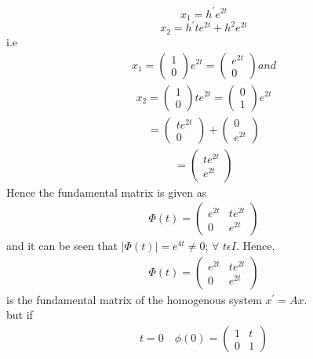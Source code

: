\documentclass[a4paper, 12pt]{article}
\begin{document}
$$ x_1 = h^\prime e^{2t} $$
$$ x_2 = h^\prime te^{2t} + h^2 e^{2t} $$
i.e 
\begin{align*}
x_1 =
\begin{pmatrix}
1 \\
0
\end{pmatrix} e^{2t} = 
\begin{pmatrix}
e^{2t}\\
0
\end{pmatrix} and
\end{align*}
\begin{align*}
x_2 =
\begin{pmatrix}
1 \\
0
\end{pmatrix} te^{2t} = 
\begin{pmatrix}
0\\
1
\end{pmatrix} e^{2t}
\end{align*} 
\begin{align*}
=
\begin{pmatrix}
te^{2t} \\
0
\end{pmatrix} + 
\begin{pmatrix}
0\\
e^{2t}
\end{pmatrix} 
\end{align*}
\begin{align*}
=
\begin{pmatrix}
te^{2t} \\
e^{2t}
\end{pmatrix} 
\end{align*}
Hence the fundamental matrix is given as 
\begin{align*}
\varPhi (t) =
\begin{pmatrix}
e^{2t} & te^{2t} \\
0 & e^{2t}
\end{pmatrix}
\end{align*}
and it can be seen that $ \left| \varPhi (t) \right| = e^{4t} \neq 0 $; $\forall$ $t \epsilon I$. Hence,
\begin{align*}
\varPhi (t) =
\begin{pmatrix}
e^{2t} & te^{2t}\\
0 & e^{2t}
\end{pmatrix}
\end{align*} is the fundamental matrix of the homogenous system $ x^\prime = Ax $. \\
but if
\begin{align*}
t=0 \quad \phi (0) =
\begin{pmatrix}
1 & t\\
0 & 1
\end{pmatrix}
\end{align*}
\end{document}
